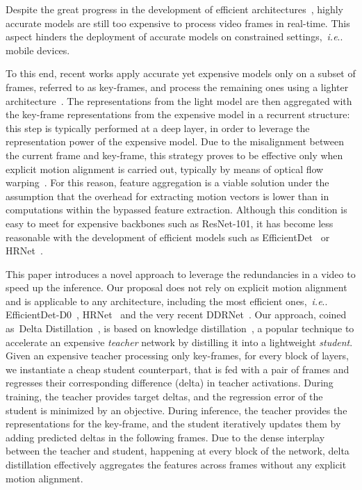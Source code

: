 \documentclass[runningheads]{llncs}
\makeatletter
\newcommand{\deltadist}{Delta Distillation~}
\DeclareRobustCommand\onedot{\futurelet\@let@token\@onedot}
\def\@onedot{\ifx\@let@token.\else.\null\fi\xspace}
\def\ie{\emph{i.e}\onedot} \def\Ie{\emph{I.e}\onedot}
\makeatother
\begin{document}
Despite the great progress in the development of efficient architectures~\cite{fasterseg,li2017PruningFF,zhang2016acceleratingvd,fanet,hrnet,efficientdet}, highly accurate models are still too expensive to process video frames in real-time.
This aspect hinders the deployment of accurate models on constrained settings,~\ie mobile devices.

To this end, recent works apply accurate yet expensive models only on a subset of frames, referred to as key-frames, and process the remaining ones using a lighter architecture~\cite{zhu17dff,accel,flow_guided,li2018low,liu2018mobile,memory_guided}. 
The representations from the light model are then aggregated with the key-frame representations from the expensive model in a recurrent structure: this step is typically performed at a deep layer, in order to leverage the representation power of the expensive model. 
Due to the misalignment between the current frame and key-frame, this strategy proves to be effective only when explicit motion alignment is carried out, typically by means of optical flow warping~\cite{zhu17dff,accel,flow_guided}.
For this reason, feature aggregation is a viable solution under the assumption that the overhead for extracting motion vectors is lower than in computations within the bypassed feature extraction.
Although this condition is easy to meet for expensive backbones such as ResNet-101, it has become less reasonable with the development of efficient models such as EfficientDet~\cite{efficientdet} or HRNet~\cite{hrnet}.

This paper introduces a novel approach to leverage the redundancies in a video to speed up the inference. 
Our proposal does not rely on explicit motion alignment and is applicable to any architecture, including the most efficient ones,~\ie EfficientDet-D0~\cite{efficientdet}, HRNet~\cite{hrnet} and the very recent DDRNet~\cite{ddrnet}. 
Our approach, coined as~\deltadist, is based on knowledge distillation~\cite{distillationsurvey,hinton}, a popular technique to accelerate an expensive \textit{teacher} network by distilling it into a lightweight \textit{student}.
Given an expensive teacher processing only key-frames, for every block of layers, we instantiate a cheap student counterpart, that is fed with a pair of frames and regresses their corresponding difference (delta) in teacher activations.
During training, the teacher provides target deltas, and the regression error of the student is minimized by an  objective.
During inference, the teacher provides the representations for the key-frame, and the student iteratively updates them by adding predicted deltas in the following frames.
Due to the dense interplay between the teacher and student, happening at every block of the network, delta distillation effectively aggregates the features across frames without any explicit motion alignment.
\end{document}

